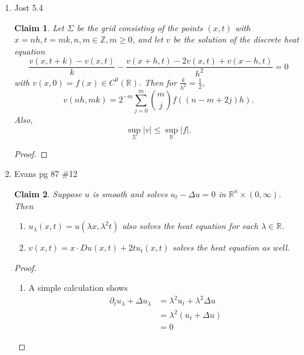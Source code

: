 \documentclass[a4paper]{article}
\newtheorem*{claim}{Claim}
\newcommand{\R}{\mathbb{R}}
\newcommand{\Z}{\mathbb{Z}}
\begin{document}
\begin{enumerate}
\begin{proof}
    Because we assumed $u_t - Lu < 0$, we must have $u_t(x_0, t_0) < 0$. But $u_t(x_0,t_0) = 0$ at an interior minimum. Therefore $x \in
    \partial \Omega_{T-\varepsilon}$.

    If $(x_0, t_0) \in \Omega \times \{T-\varepsilon\}$, then as above, we would get $Lu(x_0,t_0) \leq 0$, so $u_t(x_0, t_0) < 0$, reaching the same
    contradiction as before.
    Therefore, we must have $(x_0,t_0) \in \partial^\ast \Omega_{T-\varepsilon}$.

    Because $u$ is continuous, by taking $\varepsilon \to 0$, we get $(x_0, t_0) \in \partial^\ast \Omega_T$, as desired.

  \end{proof}

  \item Jost 5.4
    \begin{claim}
      Let $\Sigma$ be the grid consisting of the points $(x,t)$ with $x = nh, t = mk, n,m \in \Z, m \geq 0$, and let $v$ be the solution of the
      discrete heat equation
      \[ \frac{v(x,t+k) - v(x,t)}{k} - \frac{v(x+h,t) - 2v(x,t) + v(x-h,t)}{h^2} = 0 \]
      with $v(x,0) = f(x) \in C^0(\R)$.
      Then for $\frac{k}{h^2} = \frac{1}{2}$,
      \[ v(nh, mk) = 2^{-m} \sum_{j=0}^m \binom{m}{j} f \left( (n - m + 2j)h \right) .\]
      Also,
      \[ \sup_{\Sigma} |v| \leq \sup_\R |f|. \]
    \end{claim}

    \begin{proof}
    \end{proof}

  \item Evans pg 87 \#12
    \begin{claim}
      Suppose $u$ is smooth and solves $u_t - \Delta u = 0$ in $\R^n \times (0,\infty)$. Then
      \begin{enumerate}
        \item $u_\lambda(x,t) = u(\lambda x, \lambda^2 t)$ also solves the heat equation for each $\lambda \in \R$.

        \item $v(x,t) = x \cdot Du(x,t) + 2t u_t(x,t)$ solves the heat equation as well.
      \end{enumerate}

    \end{claim}

    \begin{proof}
      \begin{enumerate}
        \item
          A simple calculation shows
          \begin{align*}
            \partial_t u_\lambda + \Delta u_\lambda &= \lambda^2 u_t + \lambda^2 \Delta u \\
            &= \lambda^2 (u_t + \Delta u) \\
            &= 0
          \end{align*}


\end{enumerate}
\end{proof}
\end{enumerate}
\end{document}
